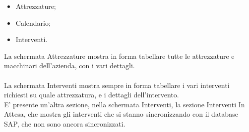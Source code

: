 \begin{itemize}
	\item Attrezzature;
	\item Calendario;
	\item Interventi.\\
\end{itemize}
La schermata Attrezzature mostra in forma tabellare tutte le attrezzature e macchinari dell'azienda, con i vari dettagli.\\\\
La schermata Interventi mostra sempre in forma tabellare i vari interventi richiesti su quale attrezzatura, e i dettagli dell'intervento.\\
E' presente un'altra sezione, nella schermata Interventi, la sezione Interventi In Attesa, che mostra gli interventi che si stanno sincronizzando con il database SAP, che non sono ancora sincronizzati.
\newpage

